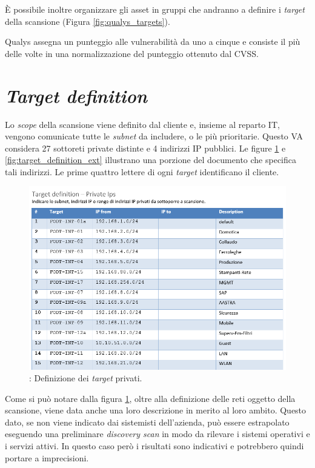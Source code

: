\documentclass[target=bach,aauheader=]{thud}
\begin{document}
È possibile inoltre organizzare gli asset in gruppi che andranno a definire i \textit{target} della scansione (Figura \ref{fig:qualys_targets}).

Qualys assegna un punteggio alle vulnerabilità da uno a cinque e consiste il più delle volte in una normalizzazione del punteggio ottenuto dal CVSS.

\section{\textit{Target definition}}
Lo \textit{scope} della scansione viene definito dal cliente e, insieme al reparto IT, vengono comunicate tutte le \textit{subnet} da includere, o le più prioritarie. Questo VA considera 27 sottoreti private distinte e 4 indirizzi IP pubblici. Le figure \ref{fig:target_definition_int} e \ref{fig:target_definition_ext} illustrano una porzione del documento che specifica tali indirizzi. Le prime quattro lettere di ogni \textit{target} identificano il cliente.

\begin{figure}[h]
\centering
\includegraphics[scale=0.8]{images/target_definition_int.png}
    \caption{: Definizione dei \textit{target} privati.}
    \label{fig:target_definition_int}
\end{figure}

Come si può notare dalla figura \ref{fig:target_definition_int}, oltre alla definizione delle reti oggetto della scansione, viene data anche una loro descrizione in merito al loro ambito. Questo dato, se non viene indicato dai sistemisti dell'azienda, può essere estrapolato eseguendo una preliminare \textit{discovery scan} in modo da rilevare i sistemi operativi e i servizi attivi. In questo caso però i risultati sono indicativi e potrebbero quindi portare a imprecisioni.
\end{document}
